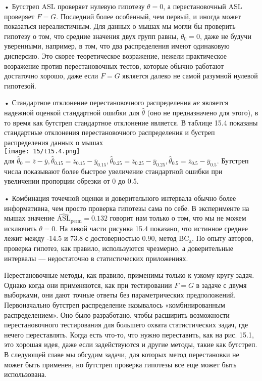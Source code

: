 • Бутстреп ASL проверяет нулевую гипотезу $\theta = 0$, а перестановочный ASL проверяет $F = G$. Последний более особенный, чем первый, и иногда может показаться нереалистичным. Для данных о мышах мы могли бы проверить гипотезу о том, что средние значения двух групп равны, $\theta_0 = 0$, даже не будучи уверенными, например, в том, что два распределения имеют одинаковую дисперсию. Это скорее теоретическое возражение, нежели практическое возражение против перестановочных тестов, которые обычно работают достаточно хорошо, даже если $F = G$ является далеко не самой разумной нулевой гипотезой.

• Стандартное отклонение перестановочного распределения \textit{не} является надежной оценкой стандартной ошибки для $\hat{\theta}$ (оно не предназначено для этого), в то время как бутстреп стандартное отклонение является. В таблице 15.4 показаны стандартные отклонения перестановочного распределения и бустреп распределения данных о мышах\\
\noindent
\texttt{[image: 15/t15.4.png]}
\newline\\
\noindent для $\hat{\theta}_0 = \bar{z} - \bar{y}, \hat{\theta}_{0.15} = \bar{z}_{0.15} - \bar{y}_{0.15}, \hat{\theta}_{0.25} = \bar{z}_{0.25} - \bar{y}_{0.25}, \hat{\theta}_{0.5} = \bar{z}_{0.5} - \bar{y}_{0.5}$. Бутстреп числа показывают более быстрое увеличение стандартной ошибки при увеличении пропорции обрезки от 0 до 0.5.

• Комбинация точечной оценки и доверительного интервала обычно более информативна, чем просто проверка гипотезы сама по себе. В эксперименте на мышах значение $\widehat{\text{ASL}}_\text{perm} = 0.132$ говорит нам только о том, что мы не можем исключить $\theta = 0$. На левой части рисунка 15.4 показано, что истинное среднее лежит между -14.5 и 73.8 с достоверностью 0.90, метод $\text{BC}_{\text{a}}$. По опыту авторов, проверка гипотез, как правило, используются чрезмерно, а доверительные интервалы --- недостаточно в статистических приложениях.

Перестановочные методы, как правило, применимы только к узкому кругу задач. Однако когда они применяются, как при тестировании $F = G$ в задаче с двумя выборками, они дают точные ответы без параметрических предположений. Первоначально бутстреп распределение называлось «комбинированным распределением». Оно было разработано, чтобы расширить возможности перестановочного тестирования для большего охвата статистических задач, где нечего переставлять. Когда есть что-то, что нужно переставить, как на рис. 15.1, это хорошая идея, даже если задействуются и другие методы, такие как бутстреп. В следующей главе мы обсудим задачи, для которых метод перестановки не может быть применен, но бутстреп проверка гипотезы все еще может быть использована.